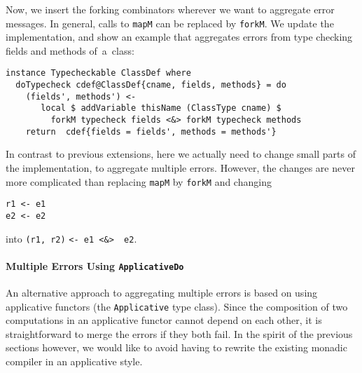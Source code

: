 \documentclass[sigplan,screen]{acmart}
\makeatletter
\newcommand{\ec}[1]{\lstinline[style=encore,breaklines=true,basicstyle=\fontsize{9}{9}\tt]@#1@}
\makeatother
\begin{document}
Now, we insert the forking
combinators wherever we want to aggregate error messages. In
general, calls to \ec{mapM} can be replaced by \ec{forkM}.
We update the implementation, and show an example
that aggregates errors
from type checking fields and methods of~a~class:

\begin{minipage}[t]{\linewidth}
\begin{lstlisting}[style=encore]
instance Typecheckable ClassDef where
  doTypecheck cdef@ClassDef{cname, fields, methods} = do
    (fields', methods') <-
       local $ addVariable thisName (ClassType cname) $
         forkM typecheck fields <&> forkM typecheck methods
    return  cdef{fields = fields', methods = methods'}
\end{lstlisting}
\end{minipage}

In contrast to  previous extensions, here we actually need to
change small parts of the implementation,
to aggregate multiple errors. However, the changes are
never more complicated than replacing \ec{mapM} by \ec{forkM}
and changing %

\begin{minipage}[t]{\linewidth}
\begin{lstlisting}[style=encore]
r1 <- e1
e2 <- e2
\end{lstlisting}
\end{minipage}
%
into \ec{(r1, r2)} \ec{<- e1 <&>  e2}.
%


\paragraph{Multiple Errors Using \texttt{ApplicativeDo}}
%
An alternative approach to aggregating multiple errors is based on
using applicative functors (the \ec{Applicative} type class).
Since the composition of two computations in an applicative
functor cannot depend on each other, it is straightforward to
merge the errors if they both fail. In the spirit of the previous
sections however, we would like to avoid having to rewrite the
existing monadic compiler in an applicative style.
\end{document}
